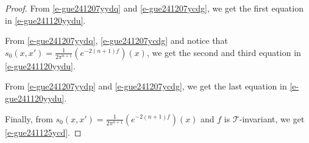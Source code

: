 \documentclass[10pt,a4paper]{amsart}
\begin{document}
\begin{proof}
From \eqref{e-gue241207yydq} and \eqref{e-gue241207ycdg}, we get the first equation in \eqref{e-gue241120yydu}. 

From \eqref{e-gue241207yydq}, \eqref{e-gue241207ycdg} and notice that $s_0(x,x')=\frac{1}{2\pi^{n+1}}(e^{-2(n+1)f})(x)$, we get the second and third equation in \eqref{e-gue241120yydu}.

From \eqref{e-gue241207yydp} and \eqref{e-gue241207ycdg}, we get the last equation in  \eqref{e-gue241120yydu}.

Finally, from $s_0(x,x')=\frac{1}{2\pi^{n+1}}(e^{-2(n+1)f})(x)$ and $f$ is $\mathcal{T}$-invariant, we get \eqref{e-gue241125ycd}.
\end{proof}
\end{document}
